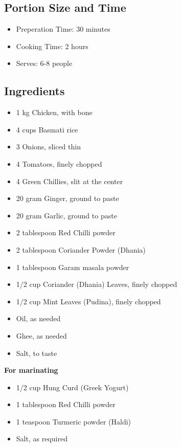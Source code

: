 \documentclass{recipe}
\begin{document}
        \subsection{Portion Size and Time}
            \begin{itemize}
                \item Preperation Time: 30 minutes
                \item Cooking Time: 2 hours
                \item Serves:   6-8 people
            \end{itemize}
        \subsection{Ingredients}
            \begin{itemize}
                \item 1 kg Chicken, with bone 
                \item 4 cups Basmati rice
                \item 3 Onions, sliced thin 
                \item 4 Tomatoes, finely chopped
                \item 4 Green Chillies, slit at the center
                \item 20 gram Ginger, ground to paste
                \item 20 gram Garlic, ground to paste
                \item 2 tablespoon Red Chilli powder	
                \item 2 tablespoon Coriander Powder (Dhania)	
                \item 1 tablespoon Garam masala powder	
                \item 1/2 cup Coriander (Dhania) Leaves, finely chopped
                \item 1/2 cup Mint Leaves (Pudina), finely chopped
                \item Oil, as needed
                \item Ghee, as needed
                \item Salt, to taste 
            \end{itemize}
            \textbf{For marinating} 
            \begin{itemize}
                \item 1/2 cup Hung Curd (Greek Yogurt)	
                \item 1 tablespoon Red Chilli powder	
                \item 1 teaspoon Turmeric powder (Haldi)	
                \item Salt, as required 
            \end{itemize}   
\end{document}
